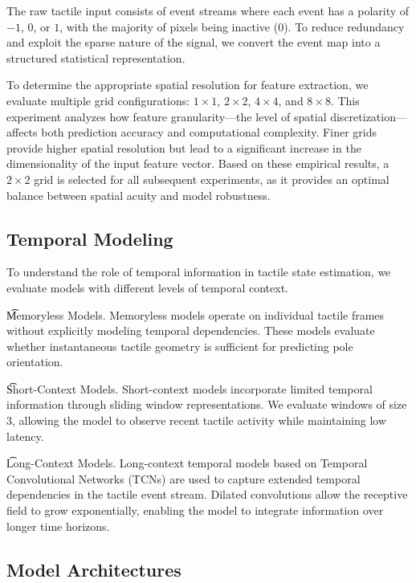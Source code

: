 \documentclass{article}
\begin{document}
The raw tactile input consists of event streams where each event has a polarity of $-1$, $0$, or $1$, with the majority of pixels being inactive ($0$). To reduce redundancy and exploit the sparse nature of the signal, we convert the event map into a structured statistical representation.

To determine the appropriate spatial resolution for feature extraction, we evaluate multiple grid configurations: $1\times1$, $2\times2$, $4\times4$, and $8\times8$. This experiment analyzes how feature granularity—the level of spatial discretization—affects both prediction accuracy and computational complexity. Finer grids provide higher spatial resolution but lead to a significant increase in the dimensionality of the input feature vector. Based on these empirical results, a {$2\times2$ grid} is selected for all subsequent experiments, as it provides an optimal balance between spatial acuity and model robustness.

\subsection{Temporal Modeling}

To understand the role of temporal information in tactile state estimation, we evaluate models with different levels of temporal context.

\par \t{Memoryless Models.}
Memoryless models operate on individual tactile frames without explicitly modeling temporal dependencies. These models evaluate whether instantaneous tactile geometry is sufficient for predicting pole orientation.

\par \t{Short-Context Models.}
Short-context models incorporate limited temporal information through sliding window representations. We evaluate windows of size $3$, allowing the model to observe recent tactile activity while maintaining low latency.

\par \t{Long-Context Models.}
Long-context temporal models based on Temporal Convolutional Networks (TCNs) are used to capture extended temporal dependencies in the tactile event stream. Dilated convolutions allow the receptive field to grow exponentially, enabling the model to integrate information over longer time horizons.

\subsection{Model Architectures}
\end{document}
